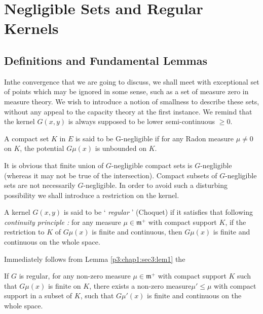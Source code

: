 \chapter{Negligible Sets and Regular Kernels}\label{p3:chap2}%

\setcounter{section}{3}
\section{Definitions and Fundamental Lemmas}\label{p3:chap2:sec4}%

In\pageoriginale the convergence that we are going to discuss, we
shall meet with 
exceptional set of points which may be ignored in some sense, such as
a set of measure zero in measure theory. We wish to introduce a notion
of smallness to describe these sets, without any appeal to the
capacity theory at the first instance. We remind that the kernel $G(x,
y)$ is always supposed to be lower semi-continuous $\ge 0$. 

\begin{defn}\label{p3:chap2:sec4:def4}%
  A compact set $K$ in $E$ is said to be G-negligible if for any Radon
  measure $\mu \neq 0$ on $K$, the potential $G \mu (x)$ is unbounded
  on $K$. 
\end{defn}

It is obvious that finite union of $G$-negligible compact sets is
$G$-negligible (whereas it may not be true of the intersection). Compact
subsets of $G$-negligible sets are not necessarily $G$-negligible. In
order to avoid such a disturbing possibility we shall introduce a
restriction on the kernel. 

\begin{defn}\label{p3:chap2:sec4:def5}%
  A kernel $G(x, y)$ is said to be `\textit{ regular }' (Choquet) if
  it satisfies that following \textit{continuity principle :} for any
  measure $\mu \in \mathfrak{m}^+$ with compact support $K$, if the restriction
  to $K$ of $G \mu (x)$ is finite and continuous, then $G \mu (x)$ is
  finite and continuous on the whole space. 
\end{defn}

Immediately follows from Lemma \ref{p3:chap1:sec3:lem1} the
\begin{Lemma}\label{p3:chap2:sec4:lem2}%
  If $G$ is regular, for any non-zero measure $\mu \in \mathfrak{m}^{+}$ with
  compact support $K$ such that $G \mu (x)$ is finite on $K$, there
  exists a non-zero measure\pageoriginale $\mu' \leq \mu$ with compact
  support in a 
  subset of $K$, such that $G \mu' (x)$ is finite and continuous on
  the whole space. 
\end{Lemma}

